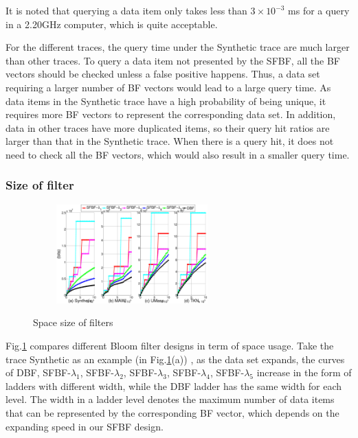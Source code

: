 \documentclass[10pt,journal,compsoc]{IEEEtran}
\newcommand{\note}[1]{{\sffamily\itshape\bfseries\uline{#1}}}
\begin{document}
It is noted that querying a data item  only takes  less than $3 \times 10^{-3}$ ms for a query in a 2.20GHz computer, which is quite acceptable.

For the different traces, the query time under the Synthetic trace are much larger than other traces. To query a data item not presented by the SFBF, all the BF vectors should be checked unless a false positive happens.
Thus, a data set requiring a larger number of BF vectors would lead to a large query time. As data items in the Synthetic trace have a high probability of being  unique, it requires more BF vectors to represent the corresponding data set.  In addition,  data in other traces have more duplicated items, so their query hit ratios are larger than that in the Synthetic trace. When there is a query hit, it does not need to check all the BF vectors, which would also result in a smaller query time.



\subsubsection{Size of filter}

\begin{figure}[!h]
\center
\includegraphics[width=3in,height=1.5in]{franztao20161209/p3_SpaceSizeFilters}\\
\caption{Space size of filters}
\label{fig:Space size of filters.}
\end{figure}



Fig.\ref{fig:Space size of filters.} compares different Bloom filter designs in term of space usage.
Take the trace Synthetic as an example (in Fig.\ref{fig:Space size of filters.}(a)) , as the data set expands, the curves of DBF, SFBF-$\lambda_1$, SFBF-$\lambda_2$, SFBF-$\lambda_3$, SFBF-$\lambda_4$, SFBF-$\lambda_5$ increase in the form of ladders with different width, while the DBF ladder has the same width for each level.
The width in a ladder level denotes the maximum number of data items that can be represented by the corresponding BF vector, which depends on the expanding speed in our SFBF design.
\end{document}
